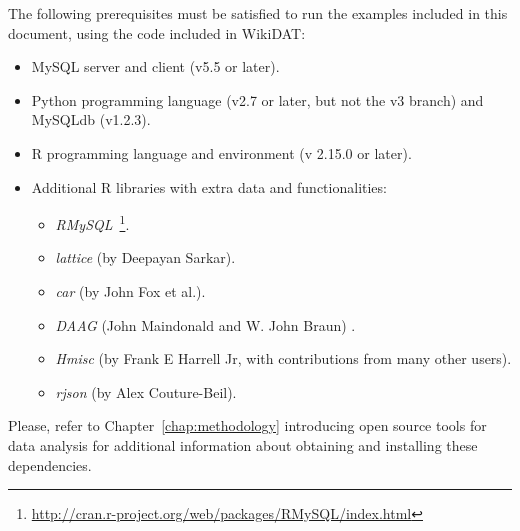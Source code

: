 The following prerequisites must be satisfied to run the examples included in this
document, using the code included in WikiDAT:

\begin{itemize}
 \item MySQL server and client (v5.5 or later).
 \item Python programming language (v2.7 or later, but not the v3 branch) and 
 MySQLdb (v1.2.3).
 \item R programming language and environment (v 2.15.0 or later).
 \item Additional R libraries with extra data and functionalities:
 \begin{itemize}
  \item \textit{RMySQL}~\footnote{\url{http://cran.r-project.org/web/packages/RMySQL/index.html}}.
  \item \textit{lattice} (by Deepayan Sarkar).
  \item \textit{car} (by John Fox et al.).
  \item \textit{DAAG} (John Maindonald and W. John Braun) .
  \item \textit{Hmisc} (by Frank E Harrell Jr, with contributions from many other users).
  \item \textit{rjson} (by Alex Couture-Beil).
 \end{itemize}

\end{itemize}

Please, refer to Chapter~\ref{chap:methodology} introducing open source tools for data
analysis for additional information about obtaining and installing these dependencies.

